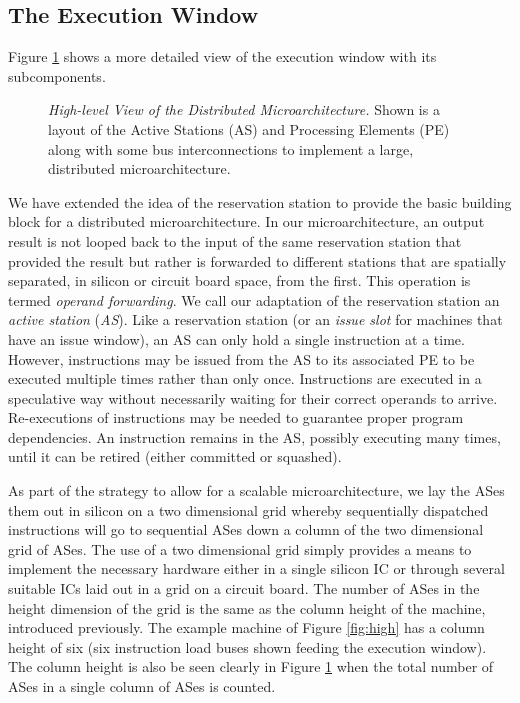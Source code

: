 \documentclass[10pt,twocolumn,dvips]{article}
\begin{document}
\subsection{The Execution Window}
%
Figure \ref{fig:window} shows a more detailed view
of the execution window with its subcomponents.
%
\begin{figure}
\centering
{}
\caption{{\em High-level View of the Distributed Microarchitecture.} 
Shown is a layout of the Active Stations (AS) and Processing Elements (PE)
along with some bus interconnections to implement a large,
distributed microarchitecture.}
\label{fig:window}
\end{figure}
%
We have extended the idea of the reservation
station \cite{Tom67} to provide the basic building block for a distributed
microarchitecture.  
In our microarchitecture,
an output result is not looped back to the input of the same reservation
station
that provided the result but rather is forwarded to different
stations that are spatially separated, in silicon or circuit board space,
from the first.  
This operation is termed \textit{operand forwarding}.
We call our adaptation of the
reservation station an \textit{active station} (\textit{AS}).
Like a reservation station (or an \textit{issue slot} for machines
that have an issue window), an AS can only hold a single
instruction at a time.  However, instructions may be issued from
the AS to its associated PE to be executed multiple 
times rather than only once.  Instructions are executed
in a speculative way without necessarily waiting for their correct
operands to arrive.  Re-executions of instructions may be needed
to guarantee proper program dependencies.
An instruction remains in the AS, possibly executing many times,
until it can be retired (either committed or squashed).

As part of the strategy to allow for a scalable microarchitecture,
we lay the ASes them out in silicon on
a two dimensional grid whereby sequentially
dispatched instructions will go to sequential ASes down a column of
the two dimensional grid of ASes.  
The use of a two dimensional
grid simply provides a means to implement the necessary
hardware either in a single silicon IC or through several
suitable ICs laid out in a grid on a circuit board.
The number of ASes in the height dimension of the grid is the
same as the column height of the machine, introduced previously.
The example machine of Figure \ref{fig:high} has a column height of
six (six instruction load buses shown feeding the execution window). 
The column height is also be seen clearly in 
Figure \ref{fig:window} when the total
number of ASes in a single column of ASes is counted.
\end{document}
